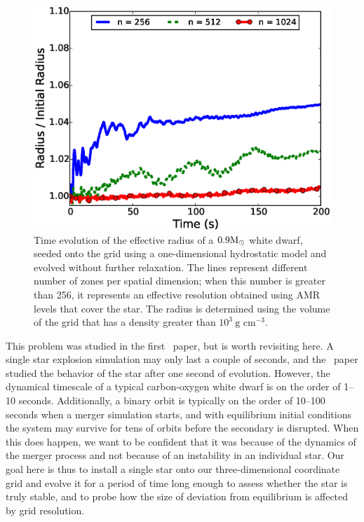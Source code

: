 \documentclass[12pt]{article}
\begin{document}
\begin{figure}[h!]
  \centering
  \includegraphics[scale=0.8,trim=0.15in 0.0in 0.55in 0.5in,clip]{plots/single_star_static_1e3_radius}
  \caption[Effective radius evolution of a static white dwarf]
          {Time evolution of the effective radius of a $0.9 \mathrm{M}_\odot$
           white dwarf, seeded onto the grid using a one-dimensional hydrostatic
           model and evolved without further relaxation. The lines represent
           different number of zones per spatial dimension; when this number is
           greater than 256, it represents an effective resolution obtained
           using AMR levels that cover the star. The radius is determined
           using the volume of the grid that has a density greater than $10^3\ \text{g cm}^{-3}.$
           \label{fig:single_star_static_radius}}
\end{figure}

This problem was studied in the first \castro\ paper, but is worth
revisiting here. A single star explosion simulation may only last a
couple of seconds, and the \castro\ paper studied the behavior of the
star after one second of evolution. However, the dynamical timescale
of a typical carbon-oxygen white dwarf is on the order of 1--10
seconds. Additionally, a binary orbit is typically on the order of
10--100 seconds when a merger simulation starts, and with equilibrium
initial conditions the system may survive for tens of orbits before
the secondary is disrupted. When this does happen, we want to be
confident that it was because of the dynamics of the merger process
and not because of an instability in an individual star. Our goal here
is thus to install a single star onto our three-dimensional
coordinate grid and evolve it for a period of time long enough to
assess whether the star is truly stable, and to probe how the size of
deviation from equilibrium is affected by grid resolution.
\end{document}
